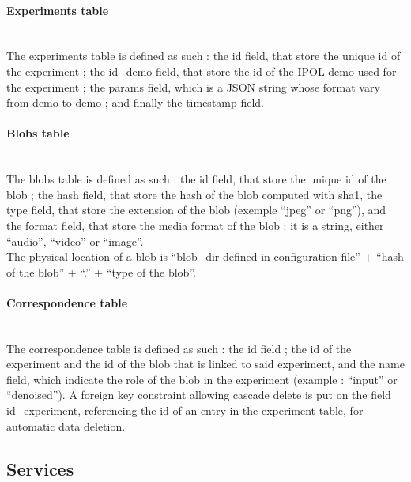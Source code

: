 \paragraph{Experiments table} \hspace{0pt} \\
The experiments table is defined as such : the id field, that store the unique id of the experiment ; the id\_demo field, that store the id of the IPOL demo used for the experiment ; the params field, which is a JSON string whose format vary from demo to demo ; and finally the timestamp field.

\paragraph{Blobs table} \hspace{0pt} \\
The blobs table is defined as such : the id field, that store the unique id of the blob ; the hash field, that store the hash of the blob computed with sha1, the type field, that store the extension of the blob (exemple ``jpeg'' or ``png''), and the format field, that store the media format of the blob : it is a string, either ``audio'', ``video'' or ``image''. \\
The physical location of a blob is ``blob\_dir defined in configuration file'' + ``hash of the blob'' + ``.'' + ``type of the blob''.

\paragraph{Correspondence table} \hspace{0pt} \\
The correspondence table is defined as such : the id field ; the id of the experiment and the id of the blob that is linked to said experiment, and the name field, which indicate the role of the blob in the experiment (example : ``input'' or ``denoised''). A foreign key constraint allowing cascade delete is put on the field id\_experiment, referencing the id of an entry in the experiment table, for automatic data deletion.

\subsection{Services}

